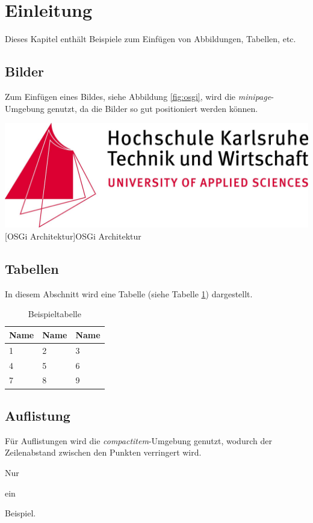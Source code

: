 \section{Einleitung}
	Dieses Kapitel enthält Beispiele zum Einfügen von Abbildungen, Tabellen, etc.

	\subsection{Bilder}
		Zum Einfügen eines Bildes, siehe Abbildung \ref{fig:osgi}, wird die \textit{minipage}-Umgebung genutzt, da die Bilder so gut positioniert werden können.

		\vspace{1em}
		\begin{minipage}{\linewidth}
			\centering
			\includegraphics[width=0.7\linewidth]{Bilder/hs_os.png}
			[OSGi Architektur]{OSGi Architektur\footnotemark }
			\label{fig:osgi}
		\end{minipage}

	\subsection{Tabellen}
		In diesem Abschnitt wird eine Tabelle (siehe Tabelle \ref{tab:beispiel}) dargestellt.

		\vspace{1em}
		\begin{table}[!h]
			\centering
			\begin{tabular}{|l|l|l|}
				\hline
				\textbf{Name} & \textbf{Name} & \textbf{Name}\\
				\hline
				1 & 2 & 3\\
				\hline
				4 & 5 & 6\\
				\hline
				7 & 8 & 9\\
				\hline
			\end{tabular}
			\caption{Beispieltabelle}
			\label{tab:beispiel}
		\end{table}

		\pagebreak
	\subsection{Auflistung}
		Für Auflistungen wird die \textit{compactitem}-Umgebung genutzt, wodurch der Zeilenabstand zwischen den Punkten verringert wird.
		\begin{compactitem}
			\item Nur
			\item ein
			\item Beispiel.
		\end{compactitem}

